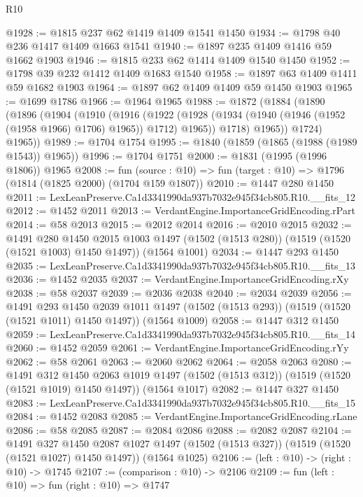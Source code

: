 \begin{lexlean}{R10}
\begin{coremodule}
@1928 := @1815 @237 @62 @1419 @1409 @1541 @1450
@1934 := @1798 @40 @236 @1417 @1409 @1663 @1541
@1940 := @1897 @235 @1409 @1416 @59 @1662 @1903
@1946 := @1815 @233 @62 @1414 @1409 @1540 @1450
@1952 := @1798 @39 @232 @1412 @1409 @1683 @1540
@1958 := @1897 @63 @1409 @1411 @59 @1682 @1903
@1964 := @1897 @62 @1409 @1409 @59 @1450 @1903
@1965 := @1699 @1786
@1966 := @1964 @1965
@1988 := @1872
    (@1884
      (@1890
        (@1896
          (@1904
            (@1910
              (@1916
                (@1922
                  (@1928 (@1934 (@1940 (@1946 (@1952 (@1958 @1966) @1706) @1965)) @1712) @1965))
                @1718)
              @1965))
          @1724)
        @1965))
@1989 := @1704 @1754
@1995 := @1840 (@1859 (@1865 (@1988 (@1989 @1543)) @1965))
@1996 := @1704 @1751
@2000 := @1831 (@1995 (@1996 @1806)) @1965
@2008 := fun (source : @10) => fun (target : @10) => @1796 (@1814 (@1825 @2000) (@1704 @159 @1807))
@2010 := @1447 @280 @1450
@2011 := LexLeanPreserve.Ca1d3341990da937b7032e945f34cb805.R10.__fits_12
@2012 := @1452 @2011
@2013 := VerdantEngine.ImportanceGridEncoding.rPart
@2014 := @58 @2013
@2015 := @2012 @2014
@2016 := @2010 @2015
@2032 := @1491
    @280
    @1450
    @2015
    @1003
    @1497
    (@1502 (@1513 @280))
    (@1519 (@1520 (@1521 @1003) @1450 @1497))
    (@1564 @1001)
@2034 := @1447 @293 @1450
@2035 := LexLeanPreserve.Ca1d3341990da937b7032e945f34cb805.R10.__fits_13
@2036 := @1452 @2035
@2037 := VerdantEngine.ImportanceGridEncoding.rXy
@2038 := @58 @2037
@2039 := @2036 @2038
@2040 := @2034 @2039
@2056 := @1491
    @293
    @1450
    @2039
    @1011
    @1497
    (@1502 (@1513 @293))
    (@1519 (@1520 (@1521 @1011) @1450 @1497))
    (@1564 @1009)
@2058 := @1447 @312 @1450
@2059 := LexLeanPreserve.Ca1d3341990da937b7032e945f34cb805.R10.__fits_14
@2060 := @1452 @2059
@2061 := VerdantEngine.ImportanceGridEncoding.rYy
@2062 := @58 @2061
@2063 := @2060 @2062
@2064 := @2058 @2063
@2080 := @1491
    @312
    @1450
    @2063
    @1019
    @1497
    (@1502 (@1513 @312))
    (@1519 (@1520 (@1521 @1019) @1450 @1497))
    (@1564 @1017)
@2082 := @1447 @327 @1450
@2083 := LexLeanPreserve.Ca1d3341990da937b7032e945f34cb805.R10.__fits_15
@2084 := @1452 @2083
@2085 := VerdantEngine.ImportanceGridEncoding.rLane
@2086 := @58 @2085
@2087 := @2084 @2086
@2088 := @2082 @2087
@2104 := @1491
    @327
    @1450
    @2087
    @1027
    @1497
    (@1502 (@1513 @327))
    (@1519 (@1520 (@1521 @1027) @1450 @1497))
    (@1564 @1025)
@2106 := (left : @10) -> (right : @10) -> @1745
@2107 := (comparison : @10) -> @2106
@2109 := fun (left : @10) => fun (right : @10) => @1747

\end{coremodule}
\end{lexlean}
